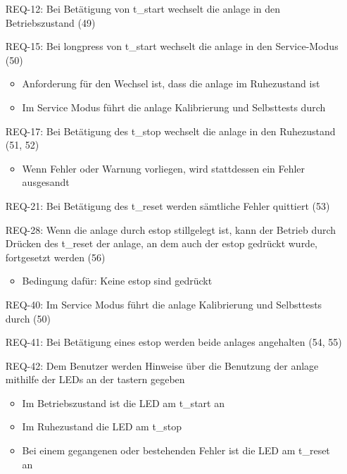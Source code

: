 \begin{itemize}
    \item[REQ-12:] Bei Betätigung von \gls{t_start} wechselt die \gls{anlage} in den Betriebszustand (49)
    \item[REQ-15:] Bei \gls{longpress} von \gls{t_start} wechselt die \gls{anlage} in den Service-Modus (50)
    \begin{itemize}
        \item Anforderung für den Wechsel ist, dass die \gls{anlage} im Ruhezustand ist
        \item Im Service Modus führt die \gls{anlage} Kalibrierung und Selbsttests durch %
    \end{itemize}
    \item[REQ-17:] Bei Betätigung des \gls{t_stop} wechselt die \gls{anlage} in den Ruhezustand (51, 52)
    \begin{itemize}
        \item Wenn Fehler oder Warnung vorliegen, wird stattdessen ein Fehler ausgesandt  %
    \end{itemize}
    \item[REQ-21:] Bei Betätigung des \gls{t_reset} werden sämtliche Fehler quittiert (53) %
    \item[REQ-28:] Wenn die \gls{anlage} durch \gls{estop} stillgelegt ist, kann der Betrieb durch Drücken des
    \gls{t_reset} der \gls{anlage}, an dem auch der \gls{estop} gedrückt wurde, fortgesetzt werden (56) %
    \begin{itemize}
        \item Bedingung dafür: Keine \gls{estop} sind gedrückt
    \end{itemize}
    \item[REQ-40:] Im Service Modus führt die \gls{anlage} Kalibrierung und Selbsttests durch (50) %
    \item[REQ-41:] Bei Betätigung eines \gls{estop} werden beide \glspl{anlage} angehalten (54, 55)
    \item[REQ-42:] Dem Benutzer werden Hinweise über die Benutzung der \gls{anlage} mithilfe der LEDs an der \gls{taster}n gegeben
    \begin{itemize}
        \item Im Betriebszustand ist die LED am \gls{t_start} an
        \item Im Ruhezustand die LED am \gls{t_stop}
        \item Bei einem gegangenen oder bestehenden Fehler ist die LED am \gls{t_reset} an
    \end{itemize}
\end{itemize}

